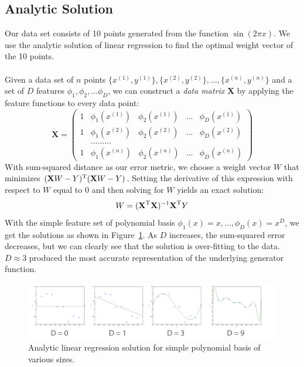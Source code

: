 \documentclass[11pt]{article}   %
\theoremstyle{plain}
\begin{document}
\subsection{Analytic Solution}
Our data set consists of 10 points generated from the function $\sin(2 \pi x)$. We  use the analytic solution of linear regression to find the optimal weight vector of the 10 points. \\
\\
\indent Given a data set of $n$ points $\{ x^{(1)}, y^{(1)} \}, \{ x^{(2)}, y^{(2)} \}, \ldots, \{ x^{(n)}, y^{(n)} \}$ and a set of $D$ features $\phi_1, \phi_2, \ldots \phi_D$, we can construct a \textit{data matrix} \textbf{X} by applying the feature functions to every data point: \\
	 \[ \textbf{X} = \left( \begin{array}{ccccc}
1 & \phi_1(x^{(1)}) & \phi_2(x^{(1)}) & ... & \phi_D(x^{(1)}) \\
1 & \phi_1(x^{(2)}) & \phi_2(x^{(2)}) & ... & \phi_D(x^{(2)}) \\
& ......... \\
1 & \phi_1(x^{(n)}) & \phi_2(x^{(n)}) & ... & \phi_D(x^{(n)}) \end{array} \right)\] 
With sum-squared distance as our error metric, we choose a weight vector $W$ that minimizes $(\textbf{X}W - Y)^\textnormal{T} (\textbf{X}W - Y)$. Setting the derivative of this expression with respect to $W$ equal to 0 and then solving for $W$ yields an exact solution:
\begin{equation} \label{eq-analytic}
	W = (\textbf{X}^\textnormal{T}\textbf{X})^{-1}\textbf{X}^{\textnormal{T}}Y
\end{equation}
\indent With the simple feature set of polynomial basis $\phi_1(x) = x,\ldots,\phi_D(x) = x^D$, we get the solutions as shown in Figure~\ref{fig-analytic}. As $D$ increases, the sum-squared error decreases, but we can clearly see that the solution is over-fitting to the data. $D \approx 3$ produced the most accurate representation of the underlying generator function. 
\begin{figure}[h!]\label{fig-analytic}
  \caption{Analytic linear regression solution for simple polynomial basis of various sizes.}
  \centering
    \includegraphics[width=1.0\textwidth]{figures/problem_2_1_full.png}
\end{figure}
\end{document}
